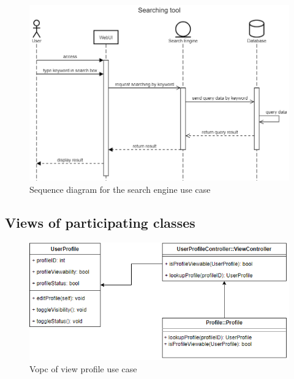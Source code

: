 \documentclass[a4paper]{article}
\begin{document}
    \begin{figure}[H]
        \centering
        \includegraphics[width=1.0\textwidth]{Searching tool.png}
        \caption{Sequence diagram for the search engine use case}
        \label{fig:fig20}
    \end{figure}

    \subsection{Views of participating classes}
    \begin{figure}[H]
        \centering
        \includegraphics[width=1.0\textwidth]{vopc_view_profile.png}
        \caption{Vopc of view profile use case}
        \label{fig:fig21}
    \end{figure}
\end{document}
